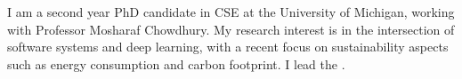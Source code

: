 

\begin{cvparagraph}

I am a second year PhD candidate in CSE at the University of Michigan, working with Professor Mosharaf Chowdhury.
My research interest is in the intersection of software systems and deep learning, with a recent focus on sustainability aspects such as energy consumption and carbon footprint.
I lead the \href{https://ml.energy}{}.
\end{cvparagraph}
